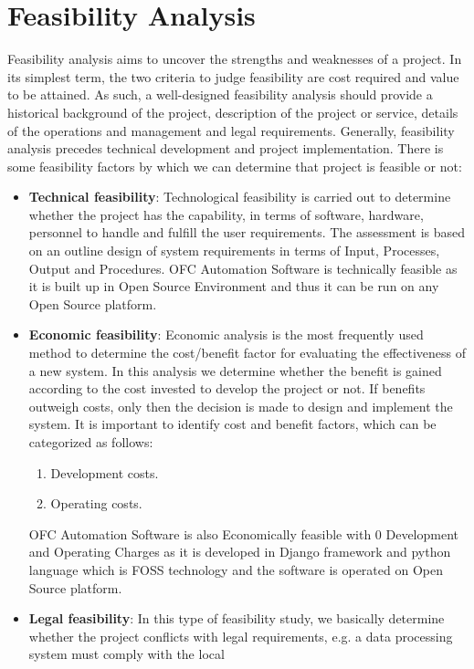 \section{Feasibility Analysis}
Feasibility analysis aims to uncover the strengths and weaknesses of 
a project. In its simplest term, the two criteria to judge feasibility 
are cost required and value to be attained. As such, a well-designed 
feasibility analysis should provide a historical background of the 
project, description of the project or service, details of the 
operations and management and legal requirements. Generally, feasibility 
analysis precedes technical development and project implementation. 
There is some feasibility factors by which we can determine that 
project is feasible or not:
\begin{itemize}
\item {\bf{Technical feasibility}}: Technological feasibility is carried 
out to determine whether the project has the capability, in terms of 
software, hardware, personnel to handle and fulfill the user 
requirements. The assessment is based on an outline design of system 
requirements in terms of Input, Processes, Output and Procedures. OFC
Automation Software is technically feasible as it is built up in Open 
Source Environment and thus it can be run on any Open Source platform.
\item {\bf{Economic feasibility}}: Economic analysis is the most 
frequently used method to determine the cost/benefit factor for 
evaluating the effectiveness of a new system. In this analysis we 
determine whether the benefit is gained according to the cost invested 
to develop the project or not. If benefits outweigh costs, only then 
the decision is made to design and implement the system. It is 
important to identify cost and benefit factors, which can be categorized 
as follows:
\begin{enumerate}
\item Development costs.
\item Operating costs.
\end{enumerate}
OFC Automation Software is also Economically feasible with 0 Development 
and Operating Charges as it is developed in Django framework and python 
language which is FOSS technology and the software is operated on Open 
Source platform.
\item {\bf {Legal feasibility}}: In this type of feasibility study, we 
basically determine whether the project conflicts with legal 
requirements, e.g. a data processing system must comply with the local 

\end{itemize}
